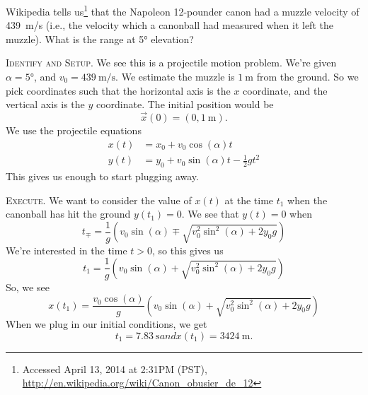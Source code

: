 
Wikipedia tells us\footnote{Accessed April 13, 2014 at 2:31PM (PST), \url{http://en.wikipedia.org/wiki/Canon_obusier_de_12}}
that the Napoleon 12-pounder canon had a muzzle velocity of
\SI{439}{\meter/\second} (i.e., the velocity which a canonball had
measured when it left the muzzle). What is the range at \ang{5} elevation?

\begin{soln}
\textsc{Identify and Setup.} We see this is a projectile motion
problem. We're given $\alpha=\ang{5}$, and
$v_{0}=\SI{439}{\meter/\second}$. We estimate the muzzle is
$\SI{1}{\meter}$ from the ground. So we pick coordinates such that the
horizontal axis is the $x$ coordinate, and the vertical axis is the $y$
coordinate. The initial position would be
\begin{equation}
\vec{x}(0)=(0,\SI{1}{\meter}).
\end{equation}
We use the projectile equations
\begin{equation*}
\begin{split}
x(t) &= x_{0} + v_{0}\cos(\alpha)t\\
y(t) &= y_{0} + v_{0}\sin(\alpha)t - \frac{1}{2}gt^{2}
\end{split}
\end{equation*}
This gives us enough to start plugging away.

\textsc{Execute.}
We want to consider the value of $x(t)$ at the time $t_{1}$ when the
canonball has hit the ground $y(t_{1})=0$. We see that $y(t)=0$ when
\begin{equation}
t_{\mp} = \frac{1}{g}\left(v_{0}\sin(\alpha)
         \mp\sqrt{v_{0}^{2}\sin^{2}(\alpha) + 2y_{0}g}\right)
\end{equation}
We're interested in the time $t>0$, so this gives us
\begin{equation}
t_{1} = \frac{1}{g}\left(v_{0}\sin(\alpha)
         + \sqrt{v_{0}^{2}\sin^{2}(\alpha) + 2y_{0}g}\right)
\end{equation}
So, we see
\begin{equation}
x(t_{1}) = \frac{v_{0}\cos(\alpha)}{g}\left(v_{0}\sin(\alpha)
         + \sqrt{v_{0}^{2}\sin^{2}(\alpha) + 2y_{0}g}\right)
\end{equation}
When we plug in our initial conditions, we get
\begin{subequations}
\begin{equation}
t_{1}=\SI{7.83}{\second}
\end{equation}
and
\begin{equation}
x(t_{1})=\SI{3424}{\meter}.
\end{equation}
\end{subequations}


\end{soln}
